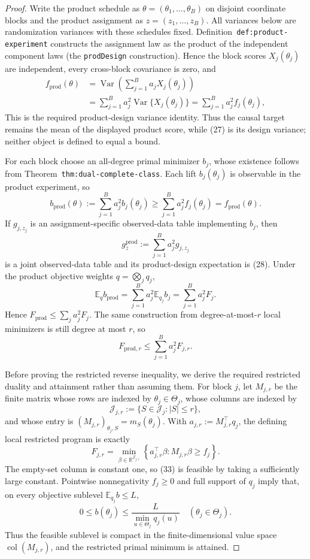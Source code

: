 \documentclass{article}
\begin{document}
\begin{proof}
Write the product schedule as \(\theta=(\theta_1,\ldots,\theta_B)\) on disjoint coordinate blocks and the product assignment as \(z=(z_1,\ldots,z_B)\).  All variances below are randomization variances with these schedules fixed.  Definition~\texttt{def:product-experiment} constructs the assignment law as the product of the independent component laws (the \texttt{prodDesign} construction). Hence the block scores \(X_j(\theta_j)\) are independent, every cross-block covariance is zero, and
\[
\begin{aligned}
f_{\mathrm{prod}}(\theta)
&=\operatorname{Var}\!\left(\sum_{j=1}^Ba_jX_j(\theta_j)\right)\\
&=\sum_{j=1}^Ba_j^2\operatorname{Var}\{X_j(\theta_j)\}
=\sum_{j=1}^Ba_j^2f_j(\theta_j),
\end{aligned}
\tag{27}
\]
This is the required product-design variance identity.  Thus the causal target remains the mean of the displayed product score, while (27) is its design variance; neither object is defined to equal a bound.

For each block choose an all-degree primal minimizer \(b_j\), whose existence follows from Theorem~\texttt{thm:dual-complete-class}.  Each lift \(b_j(\theta_j)\) is observable in the product experiment, so
\[
b_{\mathrm{prod}}(\theta):=
\sum_{j=1}^Ba_j^2b_j(\theta_j)
\ge \sum_{j=1}^Ba_j^2f_j(\theta_j)
=f_{\mathrm{prod}}(\theta).
\tag{28}
\]
If \(g_{j,z_j}\) is an assignment-specific observed-data table implementing \(b_j\), then
\[
g_z^{\mathrm{prod}}:=\sum_{j=1}^Ba_j^2g_{j,z_j}
\tag{29}
\]
is a joint observed-data table and its product-design expectation is (28).  Under the product objective weights \(q=\bigotimes_jq_j\),
\[
\mathbb E_qb_{\mathrm{prod}}
=\sum_{j=1}^Ba_j^2\mathbb E_{q_j}b_j
=\sum_{j=1}^Ba_j^2F_j.
\tag{30}
\]
Hence \(F_{\mathrm{prod}}\le\sum_ja_j^2F_j\).  The same construction from degree-at-most-\(r\) local minimizers is still degree at most \(r\), so
\[
F_{\mathrm{prod},r}\le\sum_{j=1}^Ba_j^2F_{j,r}.
\tag{31}
\]

Before proving the restricted reverse inequality, we derive the required restricted duality and attainment rather than assuming them.  For block \(j\), let \(M_{j,r}\) be the finite matrix whose rows are indexed by \(\theta_j\in\Theta_j\), whose columns are indexed by
\[
\mathcal J_{j,r}:=\{S\in\mathcal J_j:|S|\le r\},
\tag{32}
\]
and whose entry is \((M_{j,r})_{\theta_j,S}=m_S(\theta_j)\).  With \(a_{j,r}:=M_{j,r}^{\top}q_j\), the defining local restricted program is exactly
\[
F_{j,r}
=\min_{\beta\in\mathbb R^{\mathcal J_{j,r}}}
\left\{a_{j,r}^{\top}\beta:
M_{j,r}\beta\ge f_j\right\}.
\tag{33}
\]
The empty-set column is constant one, so (33) is feasible by taking a sufficiently large constant.  Pointwise nonnegativity \(f_j\ge0\) and full support of \(q_j\) imply that, on every objective sublevel \(\mathbb E_{q_j}b\le L\),
\[
0\le b(\theta_j)\le \frac{L}{\min_{u\in\Theta_j}q_j(u)}
\quad(\theta_j\in\Theta_j).
\tag{34}
\]
Thus the feasible sublevel is compact in the finite-dimensional value space \(\operatorname{col}(M_{j,r})\), and the restricted primal minimum is attained.


\end{proof}
\end{document}
